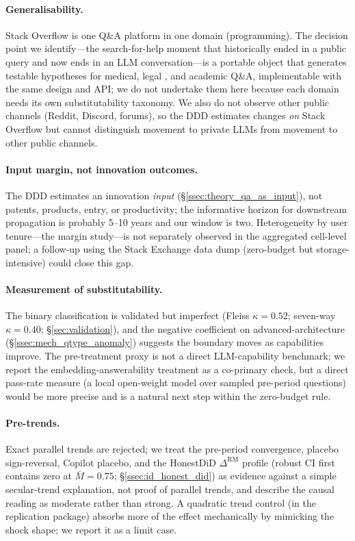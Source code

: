 \label{sec:limitations_body}

\paragraph{Generalisability.}\label{ssec:lim_generalize}
Stack Overflow is one Q\&A platform in one domain (programming).
The decision point we identify---the search-for-help moment that
historically ended in a public query and now ends in an LLM
conversation---is a portable object that generates testable
hypotheses for medical, legal \citep{choi2022chatgpt}, and
academic Q\&A, implementable with the same design and API; we do
not undertake them here because each domain needs its own
substitutability taxonomy. We also do not observe other public
channels (Reddit, Discord, forums), so the DDD estimates changes
\emph{on} Stack Overflow but cannot distinguish movement to
private LLMs from movement to other public channels.

\paragraph{Input margin, not innovation outcomes.}\label{ssec:lim_scope}
The DDD estimates an innovation \emph{input}
(\S\ref{ssec:theory_qa_as_input}), not patents, products, entry,
or productivity; the informative horizon for downstream
propagation is probably 5--10 years and our window is two.
Heterogeneity by user tenure---the margin \citet{xue2026chatgpt}
study---is not separately observed in the aggregated cell-level
panel; a follow-up using the Stack Exchange data dump
(zero-budget but storage-intensive) could close this gap.

\paragraph{Measurement of substitutability.}\label{ssec:lim_measurement}
The binary classification is validated but imperfect (Fleiss
$\kappa=0.52$; seven-way $\kappa=0.40$;
\S\ref{sec:validation}), and the negative coefficient on
advanced-architecture (\S\ref{ssec:mech_qtype_anomaly}) suggests
the boundary moves as capabilities improve. The pre-treatment
proxy is not a direct LLM-capability benchmark; we report the
embedding-answerability treatment as a co-primary check, but a
direct pass-rate measure (a local open-weight model over sampled
pre-period questions) would be more precise and is a natural next
step within the zero-budget rule.

\paragraph{Pre-trends.}\label{ssec:lim_pretrend}
Exact parallel trends are rejected; we treat the pre-period
convergence, placebo sign-reversal, Copilot placebo, and the
HonestDiD $\Delta^{\text{RM}}$ profile (robust CI first contains
zero at $\bar M=0.75$; \S\ref{ssec:id_honest_did}) as evidence
against a simple secular-trend explanation, not proof of parallel
trends, and describe the causal reading as moderate rather than
strong. A quadratic trend control (in the replication package)
absorbs more of the effect mechanically by mimicking the shock
shape; we report it as a limit case.

